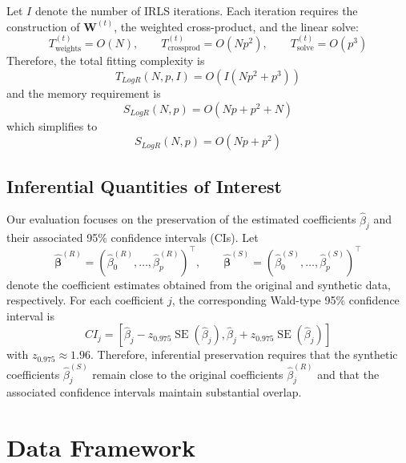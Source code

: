 Let $I$ denote the number of IRLS iterations. Each iteration requires the construction of $\mathbf{W}^{(t)}$, the weighted cross-product, and the linear solve:
\begin{equation}
    T_{\text{weights}}^{(t)} = O(N), \qquad
    T_{\text{crossprod}}^{(t)} = O(Np^2), \qquad
    T_{\text{solve}}^{(t)} = O(p^3)
\end{equation}
Therefore, the total fitting complexity is
\begin{equation}
    T_{LogR}(N,p,I) = O\!\left(I(Np^2 + p^3)\right)
\end{equation}
and the memory requirement is
\begin{equation}
    S_{LogR}(N,p) = O(Np + p^2 + N)
\end{equation}
which simplifies to
\begin{equation}
    S_{LogR}(N,p) = O(Np + p^2)
\end{equation}

\subsection{Inferential Quantities of Interest}
Our evaluation focuses on the preservation of the estimated coefficients $\hat{\beta}_j$ and their associated 95\% confidence intervals (CIs). Let
\begin{equation}
    \hat{\boldsymbol{\beta}}^{(R)} = \left(\hat{\beta}^{(R)}_0,\dots,\hat{\beta}^{(R)}_p\right)^\top,
    \qquad
    \hat{\boldsymbol{\beta}}^{(S)} = \left(\hat{\beta}^{(S)}_0,\dots,\hat{\beta}^{(S)}_p\right)^\top
\end{equation}
denote the coefficient estimates obtained from the original and synthetic data, respectively. For each coefficient $j$, the corresponding Wald-type 95\% confidence interval is
\begin{equation}
    CI_j =
    \left[
    \hat{\beta}_j - z_{0.975}\operatorname{SE}(\hat{\beta}_j),
    \hat{\beta}_j + z_{0.975}\operatorname{SE}(\hat{\beta}_j)
    \right]
\end{equation}
with $z_{0.975} \approx 1.96$. Therefore, inferential preservation requires that the synthetic coefficients $\hat{\beta}_j^{(S)}$ remain close to the original coefficients $\hat{\beta}_j^{(R)}$ and that the associated confidence intervals maintain substantial overlap.

\section{Data Framework}
\label{sec:reg-data-framework}

